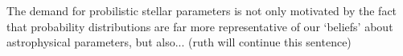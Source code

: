 The demand for probilistic stellar parameters is not only motivated by the fact
that probability distributions are far more representative of our `beliefs'
about astrophysical parameters, but also... (ruth will continue this sentence)

